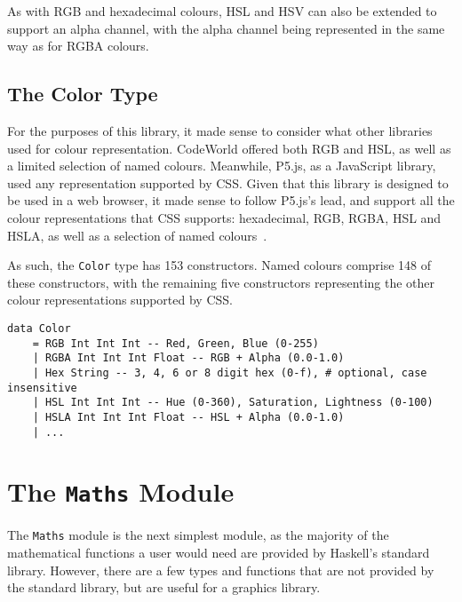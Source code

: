 \documentclass[../main.tex]{subfiles}
\begin{document}
                As with RGB and hexadecimal colours, HSL and HSV can also be extended to
                    support an alpha channel, with the alpha channel being represented in the same
                    way as for RGBA colours.

        \subsection{The Color Type}
            For the purposes of this library, it made sense to consider what other
                libraries used for colour representation.
            CodeWorld offered both RGB and HSL, as well as a limited selection of named
                colours.
            Meanwhile, P5.js, as a JavaScript library, used any representation supported by
                CSS.
            Given that this library is designed to be used in a web browser, it made sense
                to follow P5.js's lead, and support all the colour representations that CSS
                supports: hexadecimal, RGB, RGBA, HSL and HSLA, as well as a selection of named
                colours~\citep{cssColours}.

            As such, the \texttt{Color} type has 153 constructors.
            Named colours comprise 148 of these constructors, with the remaining five
                constructors representing the other colour representations supported by CSS.

            \begin{lstlisting}[label={lst:color}, caption={The \texttt{Color} type definition.
                Named colours have been omitted, but are included in the actual implementation, as seen 
                in Appendix~\ref{app:code}.}]
data Color
    = RGB Int Int Int -- Red, Green, Blue (0-255)
    | RGBA Int Int Int Float -- RGB + Alpha (0.0-1.0)
    | Hex String -- 3, 4, 6 or 8 digit hex (0-f), # optional, case insensitive
    | HSL Int Int Int -- Hue (0-360), Saturation, Lightness (0-100)
    | HSLA Int Int Int Float -- HSL + Alpha (0.0-1.0)
    | ...\end{lstlisting}

    \section{The \texttt{Maths}
        Module} The \texttt{Maths} module is the next simplest module, as the majority
            of the mathematical functions a user would need are provided by Haskell's
            standard library.
        However, there are a few types and functions that are not provided by the
            standard library, but are useful for a graphics library.
\end{document}
